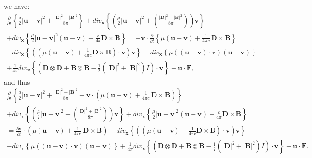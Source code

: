 \documentclass{article}
\theoremstyle{definition}
\theoremstyle{remark}
\renewcommand{\vec}[1]{\mathbf{#1}}
\begin{document}
we have:
\begin{multline}\label{vhfffngghkjgghggtghjgfhjoyuiyuyhiyyukukyihyuSYSPNNWhgjgghyuyy8yuyughghhyttyytgghhghghgghjhkjhCCmmGGKK}
\frac{\partial}{\partial t}\left\{ \frac{\mu}{2}\left|\vec u-\vec
v\right|^2+\frac{|\vec D|^2+|\vec B|^2}{8\pi}\right\}+div_{\vec
x}\left\{\left(\frac{\mu}{2}\left|\vec u-\vec
v\right|^2+\left(\frac{|\vec D|^2+|\vec
B|^2}{8\pi}\right)\right)\vec v\right\}\\+div_{\vec
x}\left\{\frac{\mu}{2}\left|\vec u-\vec v\right|^2(\vec u-\vec
v)+\frac{c}{4\pi}\vec D\times \vec B\right\}= -\vec
v\cdot\frac{\partial}{\partial t}\left\{ \mu
 \left(\vec
u-\vec v\right) +\frac{1}{4\pi c}\,\vec D\times \vec B\right\} \\-
div_{\vec x}\left\{\left(\left(\mu\left(\vec u-\vec
v\right)+\frac{1}{4\pi c}\vec D\times \vec B\right)\cdot\vec
v\right)\vec v\right\}-div_{\vec x}\left\{\mu \left(\left(\vec
u-\vec v\right)\cdot\vec v\right) \left(\vec u-\vec
v\right)\right\}\\+\frac{1}{4\pi}div_{\vec x}\left\{\left(\vec
D\otimes \vec D+\vec B\otimes \vec B-\frac{1}{2}\left(|\vec
D|^2+|\vec B|^2\right)I\right)\cdot\vec v
\right\}
+\vec u\cdot\vec F,
\end{multline}
and thus
\begin{multline}\label{vhfffngghkjgghggtghjgfhjoyuiyuyhiyyukukyihyuSYSPNNWhgjgghyuyy8yuyughghhyttyytgghhghghgghjhkjhCCmmGGKKuiiuui}
\frac{\partial}{\partial t}\left\{ \frac{\mu}{2}\left|\vec u-\vec
v\right|^2+\frac{|\vec D|^2+|\vec B|^2}{8\pi}+\vec v\cdot\left( \mu
 \left(\vec
u-\vec v\right) +\frac{1}{4\pi c}\,\vec D\times \vec
B\right)\right\}\\+div_{\vec x}\left\{\left(\frac{\mu}{2}\left|\vec
u-\vec v\right|^2+\left(\frac{|\vec D|^2+|\vec
B|^2}{8\pi}\right)\right)\vec v\right\}+div_{\vec
x}\left\{\frac{\mu}{2}\left|\vec u-\vec v\right|^2(\vec u-\vec
v)+\frac{c}{4\pi}\vec D\times \vec B\right\}\\= \frac{\partial\vec
v}{\partial t}\cdot\left( \mu
 \left(\vec
u-\vec v\right) +\frac{1}{4\pi c}\,\vec D\times \vec B\right)-
div_{\vec x}\left\{\left(\left(\mu\left(\vec u-\vec
v\right)+\frac{1}{4\pi c}\vec D\times \vec B\right)\cdot\vec
v\right)\vec v\right\}\\-div_{\vec x}\left\{\mu \left(\left(\vec
u-\vec v\right)\cdot\vec v\right) \left(\vec u-\vec
v\right)\right\}+\frac{1}{4\pi}div_{\vec x}\left\{\left(\vec
D\otimes \vec D+\vec B\otimes \vec B-\frac{1}{2}\left(|\vec
D|^2+|\vec B|^2\right)I\right)\cdot\vec v
\right\}
+\vec u\cdot\vec F.
\end{multline}
\end{document}
